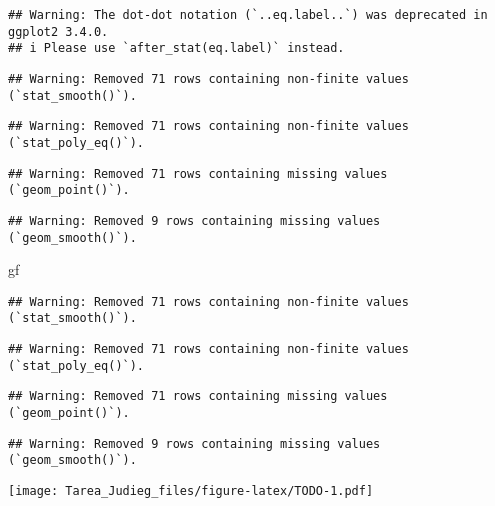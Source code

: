 \documentclass[
]{article}
\newenvironment{Shaded}{\begin{snugshade}}{\end{snugshade}}
\newcommand{\NormalTok}[1]{#1}
\begin{document}
\begin{verbatim}
## Warning: The dot-dot notation (`..eq.label..`) was deprecated in ggplot2 3.4.0.
## i Please use `after_stat(eq.label)` instead.
\end{verbatim}

\begin{verbatim}
## Warning: Removed 71 rows containing non-finite values (`stat_smooth()`).
\end{verbatim}

\begin{verbatim}
## Warning: Removed 71 rows containing non-finite values (`stat_poly_eq()`).
\end{verbatim}

\begin{verbatim}
## Warning: Removed 71 rows containing missing values (`geom_point()`).
\end{verbatim}

\begin{verbatim}
## Warning: Removed 9 rows containing missing values (`geom_smooth()`).
\end{verbatim}

\begin{Shaded}
\begin{Highlighting}[]
\NormalTok{gf}
\end{Highlighting}
\end{Shaded}

\begin{verbatim}
## Warning: Removed 71 rows containing non-finite values (`stat_smooth()`).
\end{verbatim}

\begin{verbatim}
## Warning: Removed 71 rows containing non-finite values (`stat_poly_eq()`).
\end{verbatim}

\begin{verbatim}
## Warning: Removed 71 rows containing missing values (`geom_point()`).
\end{verbatim}

\begin{verbatim}
## Warning: Removed 9 rows containing missing values (`geom_smooth()`).
\end{verbatim}

\texttt{[image: Tarea\_Judieg\_files/figure-latex/TODO-1.pdf]}
\end{document}
